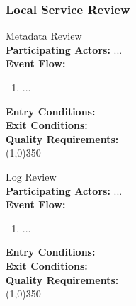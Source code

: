 \subsubsection{Local Service Review}		 
	Metadata Review \\	 
	\textbf{Participating Actors:}  ... \\
	\textbf{Event Flow:}
	\begin{enumerate}
\item  ...
    \end{enumerate}
	\textbf{Entry Conditions:}\\
	\textbf{Exit Conditions:}\\
	\textbf{Quality Requirements:}\\
	\line(1,0){350}		
			 
	Log Review \\	 
	\textbf{Participating Actors:}  ... \\
	\textbf{Event Flow:}
	\begin{enumerate}
\item  ...
    \end{enumerate}
	\textbf{Entry Conditions:}\\
	\textbf{Exit Conditions:}\\
	\textbf{Quality Requirements:}\\
	\line(1,0){350}		
